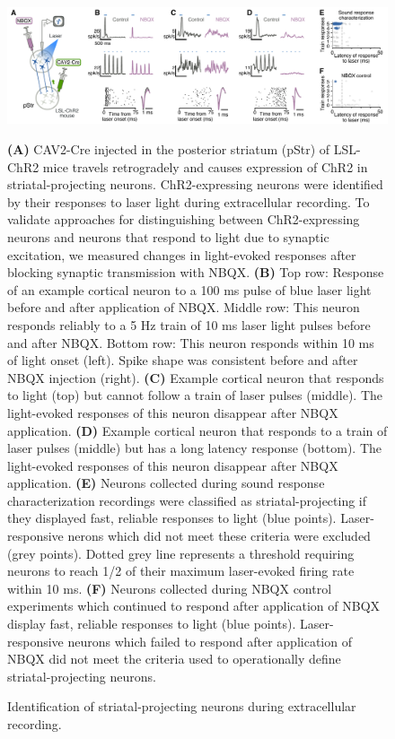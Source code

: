 \begin{figure}[hp]
  \begin{center}
    \includegraphics[width=6in]{figures/chapter3/fig2_method}%
  \end{center}
\caption{Identification of striatal-projecting neurons during extracellular recording.}{\textbf{(A)} CAV2-Cre injected in the posterior striatum (pStr) of LSL-ChR2 mice travels retrogradely and causes expression of ChR2 in striatal-projecting neurons.
%
ChR2-expressing neurons were identified by their responses to laser light during extracellular recording. 
%
To validate approaches for distinguishing between ChR2-expressing neurons and neurons that respond to light due to synaptic excitation, we measured changes in light-evoked responses after blocking synaptic transmission with NBQX.
%
\textbf{(B)} Top row: Response of an example cortical neuron to a 100 ms pulse of blue laser light before and after application of NBQX. Middle row: This neuron responds reliably to a 5 Hz train of 10 ms laser light pulses before and after NBQX. Bottom row: This neuron responds within 10 ms of light onset (left). Spike shape was consistent before and after NBQX injection (right). 
%
\textbf{(C)} Example cortical neuron that responds to light (top) but cannot follow a train of laser pulses (middle). The light-evoked responses of this neuron disappear after NBQX application. 
%
\textbf{(D)} Example cortical neuron that responds to a train of laser pulses (middle) but has a long latency response (bottom). 
%
The light-evoked responses of this neuron disappear after NBQX application. 
%
\textbf{(E)} Neurons collected during sound response characterization recordings were classified as striatal-projecting if they displayed fast, reliable responses to light (blue points). Laser-responsive nerons which did not meet these criteria were excluded (grey points).
Dotted grey line represents a threshold requiring neurons to reach 1/2 of their maximum laser-evoked firing rate within 10 ms.
%
\textbf{(F)} Neurons collected during NBQX control experiments which continued to respond after application of NBQX display fast, reliable responses to light (blue points). Laser-responsive neurons which failed to respond after application of NBQX did not meet the criteria used to operationally define striatal-projecting neurons. 
}
\end{figure}


